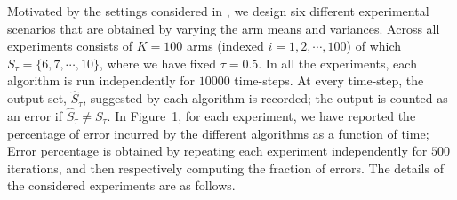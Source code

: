 
\noindent
Motivated by the settings considered in \cite{locatelli2016optimal}, 
we design six different experimental scenarios that are obtained by varying the arm means and variances. 
Across all experiments consists of $K=100$  arms (indexed $i=1,2,\cdots,100$) of which ${S}_\tau=\{6,7,\cdots,10\}$, where we have fixed $\tau=0.5$.
In all the experiments, each algorithm is run independently for $10000$ time-steps. At every time-step, the output set,  $\hat{S}_\tau$, suggested by each algorithm is recorded; the output is counted as an error if $\hat{S}_\tau\ne S_\tau$. In Figure~1, for each experiment, we have reported the percentage of error incurred by the different algorithms as a function of time; Error percentage is obtained by repeating each experiment independently  for $500$ iterations, and then respectively computing the fraction of errors. The details of the considered experiments are as follows.


 
